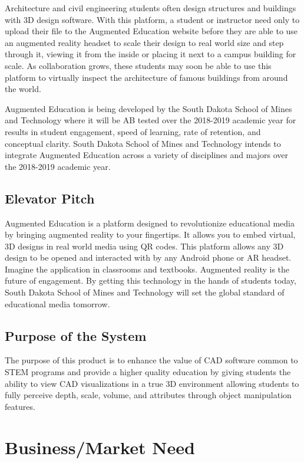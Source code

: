 Architecture and civil engineering students often design structures and buildings with 3D design software. With this platform, a student or instructor need only to upload their file to the Augmented Education website before they are able to use an augmented reality headset to scale their design to real world size and step through it, viewing it from the inside or placing it next to a campus building for scale. As collaboration grows, these students may soon be able to use this platform to virtually inspect the architecture of famous buildings from around the world. 

Augmented Education is being developed by the South Dakota School of Mines and Technology where it will be AB tested over the 2018-2019 academic year for results in student engagement, speed of learning, rate of retention, and conceptual clarity. South Dakota School of Mines and Technology intends to integrate Augmented Education across a variety of disciplines and majors over the 2018-2019 academic year.

\subsection{Elevator Pitch}
Augmented Education is a platform designed to revolutionize educational media by bringing augmented reality to your fingertips. It allows you to embed virtual, 3D designs in real world media using QR codes. This platform allows any 3D design to be opened and interacted with by any Android phone or AR headset. Imagine the application in classrooms and textbooks. Augmented reality is the future of engagement. By getting this technology in the hands of students today, South Dakota School of Mines and Technology will set the global standard of educational media tomorrow. 

\subsection{Purpose of the System}

The purpose of this product is to enhance the value of CAD software common to STEM programs and provide a higher quality education by giving students the ability to view CAD visualizations in a true 3D environment allowing students to fully perceive depth, scale, volume, and attributes through object manipulation features.


\section{Business/Market Need}

